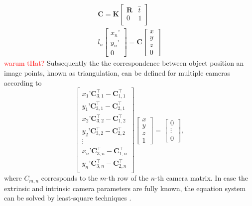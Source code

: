 \documentclass[5p,times,procedia]{elsarticle}
\begin{document}
\begin{align}
	\mathbf{C} = \mathbf{K}
	\begin{bmatrix}
		\mathbf{R} & \hat{t} \\
		0 & 1 \\
	\end{bmatrix} \\
	l_{n}
	\begin{bmatrix}
		x_n’ \\
		y_n’ \\
		0
	\end{bmatrix}
	= \mathbf{C}
	\begin{bmatrix}
		x \\
		y \\
		z \\
		0
	\end{bmatrix}
\end{align}
\textcolor{red}{warum tHat?}
Subsequently the the correspondence between object position an image points, known as triangulation, can be defined for multiple cameras according to
\begin{equation}
	\label{eqn:triangulation}
	\begin{bmatrix}
		x_{1}’ \mathbf{C}_{3,1}^{\top} - \mathbf{C}_{1,1}^{\top}\\
		y_{1}’ \mathbf{C}_{3,1}^{\top} - \mathbf{C}_{2,1}^{\top}\\
		x_{2}’ \mathbf{C}_{3,2}^{\top} - \mathbf{C}_{1,2}^{\top}\\
		y_{2}’ \mathbf{C}_{3,2}^{\top} - \mathbf{C}_{2,2}^{\top}\\
		\vdots \\
		x_{n}’ \mathbf{C}_{3,n}^{\top} - \mathbf{C}_{1,n}^{\top}\\
		y_{n}’ \mathbf{C}_{3,n}^{\top} - \mathbf{C}_{2,n}^{\top}\\
	\end{bmatrix}
	\begin{bmatrix}
		x \\
		y \\
		z \\
		1
	\end{bmatrix}
	=
	\begin{bmatrix}
		0 \\
		\vdots \\
		0
	\end{bmatrix},
\end{equation}
where $C_{m,n}$ corresponds to the $m$-th row of the $n$-th camera matrix.
In case the extrinsic and intrinsic camera parameters are fully known, the equation system can be solved by least-square techniques \cite{Ahn2004}.
\end{document}
